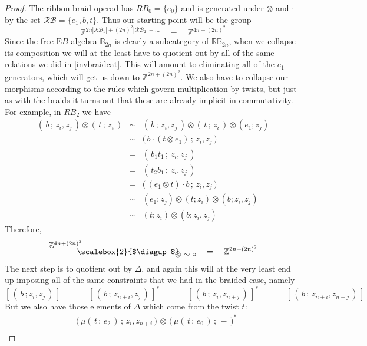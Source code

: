 \documentclass{amsbook} %
\newcommand{\bigquotient}[2]{ \raisebox{0.75\height}{$#1$} \mkern-12mu\scalebox{2}{$\diagup$}\mkern-10mu \raisebox{-0.5\height}{$#2$} }
\numberwithin{section}{chapter}
\begin{document}
\begin{proof}
The ribbon braid operad has $RB_0 = \{e_0\}$ and is generated under $\otimes$ and $\cdot$ by the set $\mathcal{RB} = \{ e_1, b, t \}$. Thus our starting point will be the group
\[ \mathbb{Z}^{2n|\mathcal{RB}_1| + (2n)^2|\mathcal{RB}_2| + ...} \quad = \quad \mathbb{Z}^{4n + (2n)^2} \]
Since the free $\mathrm{E}B$-algebra $\mathbb{B}_{2n}$ is clearly a subcategory of $\mathbb{RB}_{2n}$, when we collapse its composition we will at the least have to quotient out by all of the same relations we did in \cref{invbraidcat}. This will amount to eliminating all of the $e_1$ generators, which will get us down to $\mathbb{Z}^{2n + (2n)^2}$. We also have to collapse our morphisms according to the rules which govern multiplication by twists, but just as with the braids it turns out that these are already implicit in commutativity. For example, in $RB_2$ we have
\[ \begin{array}{rrl}
			 ( \, b \, ; \, z_i, z_j \, ) \otimes ( \, t \, ; \, z_i \,) & \sim & ( \, b \, ; \, z_i, z_j \, ) \otimes ( \, t \, ; \, z_i \,) \otimes (e_1; z_j) \\
			& \sim & \big( \, b \cdot (t \otimes e_1) \, ; \, z_i, z_j \, \big) \\	
			& = & ( \, b_1 t_1 \, ; \, z_i, z_j \,) \\
			& = & ( \, t_2 b_1 \, ; \, z_i, z_j \,) \\
			& = & \big( \, (e_1 \otimes t) \cdot b \, ; \, z_i, z_j \, \big) \\
			& \sim & (e_1; z_j) \otimes ( t ; z_i ) \otimes ( b; z_i, z_j ) \\
			& \sim & ( t ;z_i ) \otimes ( b ; z_i, z_j)
		\end{array}
\]
Therefore,
\[ \bigquotient{\mathbb{Z}^{4n + (2n)^2}}{\otimes \sim \circ} \quad = \quad \mathbb{Z}^{2n + (2n)^2} \]
The next step is to quotient out by $\Delta$, and again this will at the very least end up imposing all of the same constraints that we had in the braided case, namely
\[ [ \, ( \, b \, ; z_i, z_j \, ) \, ] \quad = \quad [ \, ( \, b \, ; \, z_{n+i}, z_j \, ) \, ]^* \quad = \quad [ \, ( \, b \, ; \, z_i, z_{n+j} \, ) \, ]^* \quad = \quad [ \, ( \, b \, ; \, z_{n+i}, z_{n+j} \, ) \, ]  \]
But we also have those elements of $\Delta$ which come from the twist $t$:
\[ \begin{array}{rl}
			& \big( \, \mu( \, t \, ; \, e_2 \, ) \, ; \, z_i, z_{n+i} \, \big) \, \otimes \, \big( \,  \mu( \, t \, ; \, e_0 \, ) \, ; \, - \, \big)^* \\

\end{array}\]
\end{proof}
\end{document}
